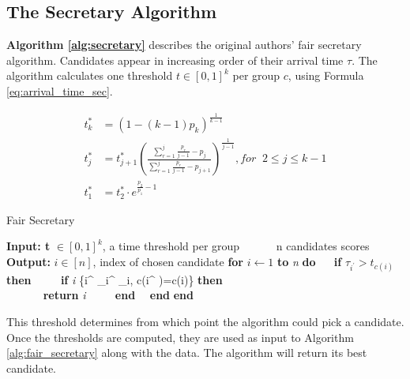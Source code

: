 \subsection{The Secretary Algorithm}

\begin{minipage}{0.46\textwidth}
\textbf{Algorithm \ref{alg:secretary}} describes the original authors' fair secretary algorithm. Candidates appear in increasing order of their arrival time $\tau$. The algorithm calculates one threshold $t \in [0,1]^k$ per group $c$, using Formula \ref{eq:arrival_time_sec}.

\begin{equation}
\label{eq:arrival_time_sec}
\begin{split}
t_k^* &= (1 - (k - 1)p_k)^{\frac{1}{k-1}} \\
t_j^* &= t_{j+1}^* \left( \frac{\sum_{r=1}^j \frac{p_r}{j-1} - p_j}{\sum_{r=1}^j \frac{p_r}{j-1} - p_{j+1}} \right)^{\frac{1}{j-1}},for\;\;2\leq j \leq k - 1 \\
t_1^* &= t_2^* \cdot e^{\frac{p_2}{p_1} - 1}
\end{split}
\end{equation}
\end{minipage}
\hfill
\begin{minipage}{0.46\textwidth}
\begin{algorithm}[H]
\caption{Fair Secretary}\label{alg:secretary}
\begin{algorithmic}
\State \textbf{Input: t} $\in [0,1]^k $, a time threshold per group
\State $\qquad \>\>\>$ n candidates scores
\State \textbf{Output: }$i \in [n]$, index of chosen candidate
\State \textbf{for} $i \leftarrow 1$ \textbf{to} \textit{n} \textbf{do}
\State $\quad$ \textbf{if} $\tau_{i^{\prime}} > t_{c(i)}$ \textbf{then}
\State $\qquad$ \textbf{if} \textit{i} \succ \max \left\{i^{\prime} \mid \tau_{i^{\prime}} \leq \tau_{i}, c\left(i^{\prime} \mid\right)=c(i)\right\} \textbf{then}\\
\State $\qquad \quad$ \textbf{return} \textit{i}
\State $\qquad$ \textbf{end}
\State $\quad$\textbf{end}
\State \textbf{end}
\State
\end{algorithmic}
\label{alg:fair_secretary}
\end{algorithm}
\end{minipage}


This threshold determines from which point the algorithm could pick a candidate. Once the thresholds are computed, they are used as input to Algorithm \ref{alg:fair_secretary} along with the data. The algorithm will return its best candidate.

